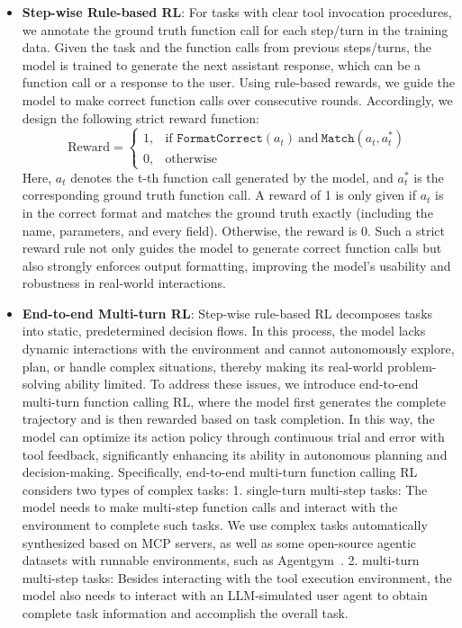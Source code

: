 \begin{itemize}[leftmargin=*,itemsep=0pt,topsep=0pt]
    \item \textbf{Step-wise Rule-based RL}: For tasks with clear tool invocation procedures, we annotate the ground truth function call for each step/turn in the training data. Given the task and the function calls from previous steps/turns, the model is trained to generate the next assistant response, which can be a function call or a response to the user. Using rule-based rewards, we guide the model to make correct function calls over consecutive rounds.
    Accordingly, we design the following strict reward function:
    $$\text{Reward} =
    \begin{cases}
    1, & \text{if } \texttt{FormatCorrect}(a_t)\ \text{and}\ \texttt{Match}(a_t, a_t^*) \\
    0, & \text{otherwise}
    \end{cases}$$
    Here, $a_t$ denotes the t-th function call generated by the model, and $a_t^*$ is the corresponding ground truth function call. A reward of 1 is only given if $a_t$ is in the correct format and matches the ground truth exactly (including the name, parameters, and every field). Otherwise, the reward is 0.
    Such a strict reward rule not only guides the model to generate correct function calls but also strongly enforces output formatting, improving the model’s usability and robustness in real-world interactions.
    \item \textbf{End-to-end Multi-turn RL}: Step-wise rule-based RL decomposes tasks into static, predetermined decision flows. In this process, the model lacks dynamic interactions with the environment and cannot autonomously explore, plan, or handle complex situations, thereby making its real-world problem-solving ability limited. To address these issues, we introduce end-to-end multi-turn function calling RL, where the model first generates the complete trajectory and is then rewarded based on task completion. In this way, the model can optimize its action policy through continuous trial and error with tool feedback, significantly enhancing its ability in autonomous planning and decision-making.
    Specifically, end-to-end multi-turn function calling RL considers two types of complex tasks: 1. single-turn multi-step tasks: The model needs to make multi-step function calls and interact with the environment to complete such tasks. We use complex tasks automatically synthesized based on MCP servers, as well as some open-source agentic datasets with runnable environments, such as Agentgym~\cite{xi2024agentgym}. 2. multi-turn multi-step tasks: Besides interacting with the tool execution environment, the model also needs to interact with an LLM-simulated user agent to obtain complete task information and accomplish the overall task.

\end{itemize}

